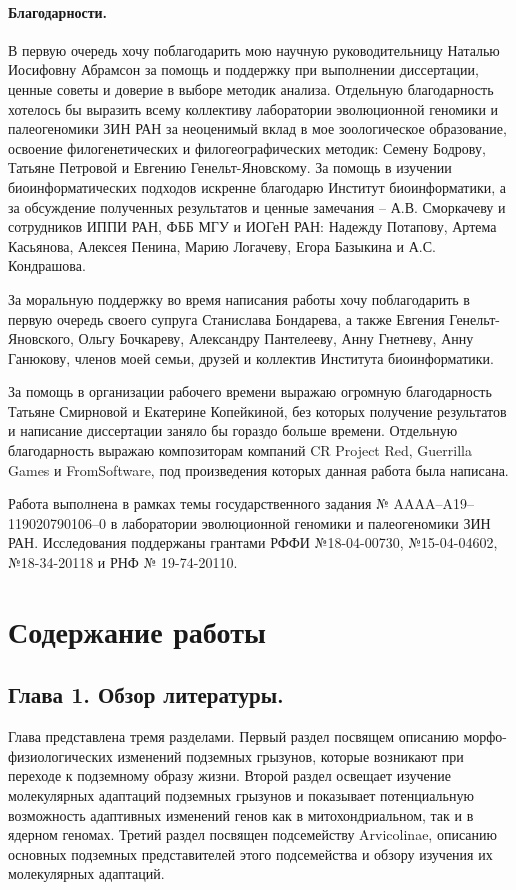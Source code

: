 \paragraph{Благодарности.}
В первую очередь хочу поблагодарить мою научную руководительницу Наталью Иосифовну Абрамсон за помощь и поддержку при выполнении диссертации, ценные советы и доверие в выборе методик анализа. Отдельную благодарность хотелось бы выразить всему коллективу лаборатории эволюционной геномики и палеогеномики ЗИН РАН за неоценимый вклад в мое зоологическое образование, освоение филогенетических и филогеографических методик: Семену Бодрову, Татьяне Петровой и Евгению Генельт-Яновскому. За помощь в изучении биоинформатических подходов искренне благодарю Институт биоинформатики, а за обсуждение полученных результатов и ценные замечания -- А.В. Сморкачеву и сотрудников ИППИ РАН, ФББ МГУ и ИОГеН РАН: Надежду Потапову, Артема Касьянова, Алексея Пенина, Марию Логачеву, Егора Базыкина и А.С. Кондрашова.   

За моральную поддержку во время написания работы хочу поблагодарить в первую очередь своего супруга Станислава Бондарева, а также Евгения Генельт-Яновского, Ольгу Бочкареву, Александру Пантелееву, Анну Гнетневу, Анну Ганюкову, членов моей семьи, друзей и коллектив Института биоинформатики.

За помощь в организации рабочего времени выражаю огромную благодарность Татьяне Смирновой и Екатерине Копейкиной, без которых получение результатов и написание диссертации заняло бы гораздо больше времени. Отдельную благодарность выражаю композиторам компаний CR Project Red, Guerrilla Games и FromSoftware, под произведения которых данная работа была написана. 

Работа выполнена в рамках темы государственного задания № AAAA–A19–119020790106–0 в лаборатории эволюционной геномики и палеогеномики ЗИН РАН. Исследования поддержаны грантами РФФИ №18-04-00730, №15-04-04602, №18-34-20118 и РНФ № 19-74-20110.


\newpage
\section*{Содержание работы}

\subsection*{Глава 1. Обзор литературы.}
Глава представлена тремя разделами. Первый раздел посвящем описанию морфо-физиологических изменений подземных грызунов, которые возникают при переходе к подземному образу жизни. Второй раздел освещает изучение молекулярных адаптаций подземных грызунов и показывает потенциальную возможность адаптивных изменений генов как в митохондриальном, так и в ядерном геномах. Третий раздел посвящен подсемейству Arvicolinae, описанию основных подземных представителей этого подсемейства и обзору изучения их молекулярных адаптаций. 


